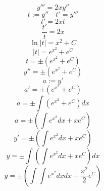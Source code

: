 



\[y'''=2xy''\]
\[t := y'' \quad t'=y'''\]
\[t' = 2xt\]
\[\frac{t'}{t} = 2x\]
\[\ln |t| = x^2 + C\]
\[|t| = e^{x^2} + e^C\]
\[t = \pm(e^{x^2} + e^C)\]
\[y'' = \pm(e^{x^2} + e^C)\]
\[a := y'\]
\[a' = \pm(e^{x^2} + e^C)\]
\[a = \pm\int (e^{x^2} + e^C)dx\]
\[a = \pm\left(\int e^{x^2} dx + xe^C\right)\]
\[y' = \pm\left(\int e^{x^2} dx + xe^C\right)\]
\[y = \pm\int\left(\int e^{x^2} dx + xe^C\right)dx\]
\[y = \pm\left(\int\int e^{x^2} dx dx + \frac{x^2}{2}e^C\right)\]

